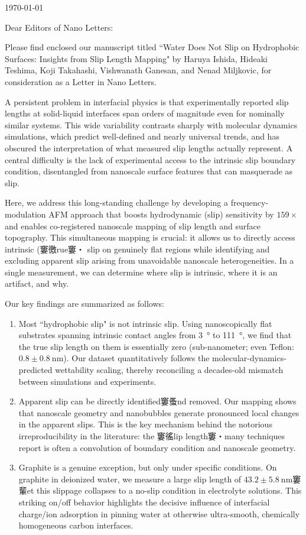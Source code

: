 ﻿\documentclass{article}
\begin{document}
\today

Dear Editors of Nano Letters:

Please find enclosed our manuscript titled ``Water Does Not Slip on Hydrophobic Surfaces: Insights from Slip Length Mapping" by Haruya Ishida, Hideaki Teshima, Koji Takahashi, Vishwanath Ganesan, and Nenad Miljkovic, for consideration as a Letter in Nano Letters.

A persistent problem in interfacial physics is that experimentally reported slip lengths at solid-liquid interfaces span orders of magnitude even for nominally similar systems. This wide variability contrasts sharply with molecular dynamics simulations, which predict well-defined and nearly universal trends, and has obscured the interpretation of what measured slip lengths actually represent. A central difficulty is the lack of experimental access to the intrinsic slip boundary condition, disentangled from nanoscale surface features that can masquerade as slip.

Here, we address this long-standing challenge by developing a frequency-modulation AFM approach that boosts hydrodynamic (slip) sensitivity by $159\times$ and enables co-registered nanoscale mapping of slip length and surface topography. This simultaneous mapping is crucial: it allows us to directly access intrinsic (窶徼rue窶・ slip on genuinely flat regions while identifying and excluding apparent slip arising from unavoidable nanoscale heterogeneities. In a single measurement, we can determine where slip is intrinsic, where it is an artifact, and why.

Our key findings are summarized as follows:
\begin{enumerate}
\item Most ``hydrophobic slip" is not intrinsic slip. Using nanoscopically flat substrates spanning intrinsic contact angles from \SI{3}{\degree} to \SI{111}{\degree}, we find that the true slip length on them is essentially zero (sub-nanometer; even Teflon: $0.8 \pm  \SI{0.8}{\nano\metre}$). Our dataset quantitatively follows the molecular-dynamics-predicted wettability scaling, thereby reconciling a decades-old mismatch between simulations and experiments.

\item Apparent slip can be directly identified窶蚤nd removed. Our mapping shows that nanoscale geometry and nanobubbles generate pronounced local changes in the apparent slips. This is the key mechanism behind the notorious irreproducibility in the literature: the 窶徭lip length窶・many techniques report is often a convolution of boundary condition and nanoscale geometry.

\item Graphite is a genuine exception, but only under specific conditions. On graphite in deionized water, we measure a large slip length of $43.2 \pm \SI{5.8}{\nano\metre}$窶輩et this slippage collapses to a no-slip condition in electrolyte solutions. This striking on/off behavior highlights the decisive influence of interfacial charge/ion adsorption in pinning water at otherwise ultra-smooth, chemically homogeneous carbon interfaces.
\end{enumerate}
\end{document}
